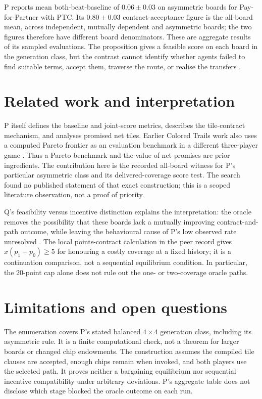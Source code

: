 \documentclass{article}
\begin{document}
P reports mean both-beat-baseline of \(0.06\pm0.03\) on asymmetric boards for Pay-for-Partner with PTC. Its
\(0.80\pm0.03\) contract-acceptance figure is the all-board mean, across independent, mutually dependent and
asymmetric boards; the two figures therefore have different board denominators. These are aggregate results
of its sampled evaluations. The proposition gives a
feasible score on each board in the generation class, but the contrast cannot identify whether agents failed
to find suitable terms, accept them, traverse the route, or realise the transfers \cite{wyse2026commitment}.

\section{Related work and interpretation}

P itself defines the baseline and joint-score metrics, describes the tile-contract mechanism, and analyses
promised net tiles. Earlier Colored Trails work also uses a computed Pareto frontier as an evaluation
benchmark in a different three-player game \cite{wyse2026commitment,li2025combining}. Thus a Pareto benchmark
and the value of net promises are prior ingredients. The contribution here is the recorded all-board witness
for P's particular asymmetric class and its delivered-coverage score test. The search found no published
statement of that exact construction; this is a scoped literature observation, not a proof of priority.

Q's feasibility versus incentive distinction explains the interpretation: the oracle removes the possibility
that these boards lack a mutually improving contract-and-path outcome, while leaving the behavioural cause of
P's low observed rate unresolved \cite{bergemann2026mechanism,wyse2026commitment}. The local points-contract
calculation in the peer record gives \(x(p_1-p_0)\geq5\) for honouring a costly coverage at a fixed history;
it is a continuation comparison, not a sequential equilibrium condition. In particular, the \(20\)-point cap
alone does not rule out the one- or two-coverage oracle paths. %

\section{Limitations and open questions}

The enumeration covers P's stated balanced \(4\times4\) generation class, including its asymmetric rule. It is
a finite computational check, not a theorem for larger boards or changed chip endowments. The construction
assumes the compiled tile clauses are accepted, enough chips remain when invoked, and both players use the
selected path. It proves neither a bargaining equilibrium nor sequential incentive compatibility under
arbitrary deviations. P's aggregate table does not disclose which stage blocked the oracle outcome on each
run. %
\end{document}
